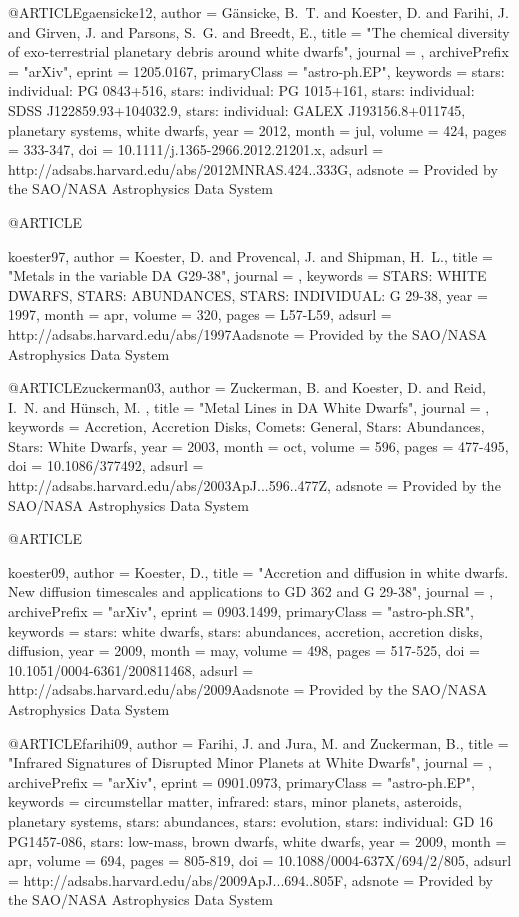 \documentclass[a4paper,fleqn,usenatbib]{mnras}
\begin{document}
{{{@ARTICLE{gaensicke12,
   author = {{G{\"a}nsicke}, B.~T. and {Koester}, D. and {Farihi}, J. and 
	{Girven}, J. and {Parsons}, S.~G. and {Breedt}, E.},
    title = "{The chemical diversity of exo-terrestrial planetary debris around white dwarfs}",
  journal = {\mnras},
archivePrefix = "arXiv",
   eprint = {1205.0167},
 primaryClass = "astro-ph.EP",
 keywords = {stars: individual: PG 0843+516, stars: individual: PG 1015+161, stars: individual: SDSS J122859.93+104032.9, stars: individual: GALEX J193156.8+011745, planetary systems, white dwarfs},
     year = 2012,
    month = jul,
   volume = 424,
    pages = {333-347},
      doi = {10.1111/j.1365-2966.2012.21201.x},
   adsurl = {http://adsabs.harvard.edu/abs/2012MNRAS.424..333G},
  adsnote = {Provided by the SAO/NASA Astrophysics Data System}
}

@ARTICLE{koester97,
   author = {{Koester}, D. and {Provencal}, J. and {Shipman}, H.~L.},
    title = "{Metals in the variable DA G29-38}",
  journal = {\aap},
 keywords = {STARS: WHITE DWARFS, STARS: ABUNDANCES, STARS: INDIVIDUAL: G 29-38},
     year = 1997,
    month = apr,
   volume = 320,
    pages = {L57-L59},
   adsurl = {http://adsabs.harvard.edu/abs/1997Aadsnote = {Provided by the SAO/NASA Astrophysics Data System}
}

@ARTICLE{zuckerman03,
   author = {{Zuckerman}, B. and {Koester}, D. and {Reid}, I.~N. and {H{\"u}nsch}, M.
	},
    title = "{Metal Lines in DA White Dwarfs}",
  journal = {\apj},
 keywords = {Accretion, Accretion Disks, Comets: General, Stars: Abundances, Stars: White Dwarfs},
     year = 2003,
    month = oct,
   volume = 596,
    pages = {477-495},
      doi = {10.1086/377492},
   adsurl = {http://adsabs.harvard.edu/abs/2003ApJ...596..477Z},
  adsnote = {Provided by the SAO/NASA Astrophysics Data System}
}

@ARTICLE{koester09,
   author = {{Koester}, D.},
    title = "{Accretion and diffusion in white dwarfs. New diffusion timescales and applications to GD 362 and G 29-38}",
  journal = {\aap},
archivePrefix = "arXiv",
   eprint = {0903.1499},
 primaryClass = "astro-ph.SR",
 keywords = {stars: white dwarfs, stars: abundances, accretion, accretion disks, diffusion},
     year = 2009,
    month = may,
   volume = 498,
    pages = {517-525},
      doi = {10.1051/0004-6361/200811468},
   adsurl = {http://adsabs.harvard.edu/abs/2009Aadsnote = {Provided by the SAO/NASA Astrophysics Data System}
}

@ARTICLE{farihi09,
   author = {{Farihi}, J. and {Jura}, M. and {Zuckerman}, B.},
    title = "{Infrared Signatures of Disrupted Minor Planets at White Dwarfs}",
  journal = {\apj},
archivePrefix = "arXiv",
   eprint = {0901.0973},
 primaryClass = "astro-ph.EP",
 keywords = {circumstellar matter, infrared: stars, minor planets, asteroids, planetary systems, stars: abundances, stars: evolution, stars: individual: GD 16 PG1457-086, stars: low-mass, brown dwarfs, white dwarfs},
     year = 2009,
    month = apr,
   volume = 694,
    pages = {805-819},
      doi = {10.1088/0004-637X/694/2/805},
   adsurl = {http://adsabs.harvard.edu/abs/2009ApJ...694..805F},
  adsnote = {Provided by the SAO/NASA Astrophysics Data System}
}

}}}}}
\end{document}

